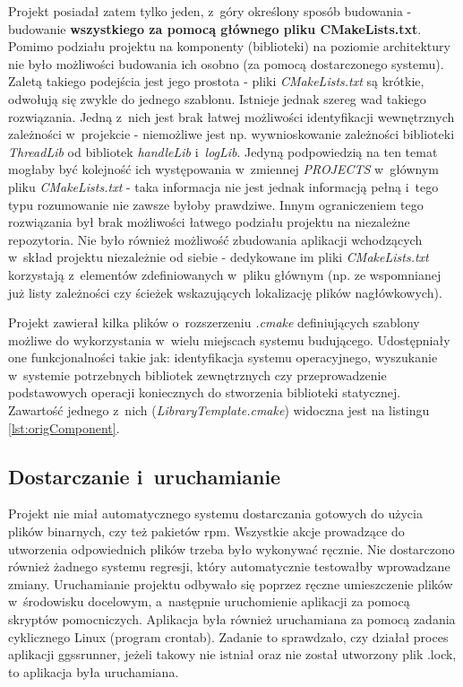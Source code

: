 Projekt posiadał zatem tylko jeden, z~góry określony sposób budowania - budowanie \textbf{wszystkiego za pomocą głównego pliku CMakeLists.txt}. Pomimo podziału projektu na komponenty (biblioteki) na poziomie architektury nie było możliwości budowania ich osobno (za pomocą dostarczonego systemu). Zaletą takiego podejścia jest jego prostota - pliki \textit{CMakeLists.txt} są krótkie, odwołują się zwykle do jednego szablonu. Istnieje jednak szereg wad takiego rozwiązania. Jedną z~nich jest brak łatwej możliwości identyfikacji wewnętrznych zależności w~projekcie - niemożliwe jest np. wywnioskowanie zależności biblioteki \textit{ThreadLib} od bibliotek \textit{handleLib} i~\textit{logLib}. Jedyną podpowiedzią na ten temat mogłaby być kolejność ich występowania w~zmiennej \textit{PROJECTS} w~głównym pliku \textit{CMakeLists.txt} - taka informacja nie jest jednak informacją pełną i~tego typu rozumowanie nie zawsze byłoby prawdziwe. Innym ograniczeniem tego rozwiązania był brak możliwości łatwego podziału projektu na niezależne repozytoria. Nie było również możliwość zbudowania aplikacji wchodzących w~skład projektu niezależnie od siebie - dedykowane im pliki \textit{CMakeLists.txt} korzystają z~elementów zdefiniowanych w~pliku głównym (np. ze wspomnianej już listy zależności czy ścieżek wskazujących lokalizację plików nagłówkowych). 

Projekt zawierał kilka plików o~rozszerzeniu \textit{.cmake} definiujących szablony możliwe do wykorzystania w~wielu miejscach systemu budującego. Udostępniały one funkcjonalności takie jak: identyfikacja systemu operacyjnego, wyszukanie w~systemie potrzebnych bibliotek zewnętrznych czy przeprowadzenie podstawowych operacji koniecznych do stworzenia biblioteki statycznej. Zawartość jednego z~nich (\textit{LibraryTemplate.cmake}) widoczna jest na listingu \ref{lst:origComponent}.


\subsection{Dostarczanie i~uruchamianie}

Projekt nie miał automatycznego systemu dostarczania gotowych do użycia plików binarnych, czy też pakietów \gls*{rpm}. Wszystkie akcje prowadzące do utworzenia odpowiednich plików trzeba było wykonywać ręcznie. Nie dostarczono również żadnego systemu regresji, który automatycznie testowałby wprowadzane zmiany. Uruchamianie projektu odbywało się poprzez ręczne umieszczenie plików w~środowisku docelowym, a~następnie uruchomienie aplikacji za pomocą skryptów pomocniczych. Aplikacja była również uruchamiana za pomocą zadania cyklicznego Linux (program crontab). Zadanie to sprawdzało, czy działał proces aplikacji ggssrunner, jeżeli takowy nie istniał oraz nie został utworzony plik .lock, to aplikacja była uruchamiana.

